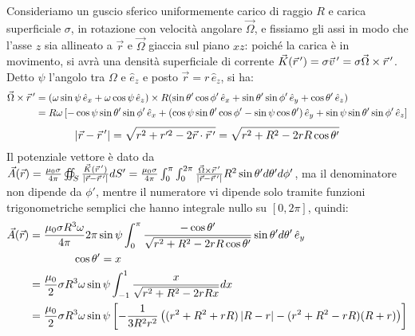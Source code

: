 Consideriamo un guscio sferico uniformemente carico di raggio $ R $ e carica superficiale $ \sigma $, in rotazione con velocità angolare $ \vec{\Omega} $, e fissiamo gli assi in modo che l'asse $ z $ sia allineato a $ \vec{r} $ e $ \vec{\Omega} $ giaccia sul piano $ xz $: poiché la carica è in movimento, si avrà una densità superficiale di corrente $ \vec{K}(\vec{r}\,') = \sigma\vec{v}\,' = \sigma\vec{\Omega}\times\vec{r}\,' $. \\ 
%
Detto $ \psi $ l'angolo tra $ \Omega $ e $ \hat{e}_z $ e posto $ \vec{r} = r\,\hat{e}_z $, si ha:
\begin{equation}
	\begin{split}
		\vec{\Omega}\times\vec{r}\,' &= (\omega \sin\psi \,\hat{e}_x + \omega \cos\psi \,\hat{e}_z) \times R (\sin\theta'\cos\phi' \,\hat{e}_x + \sin\theta'\sin\phi' \,\hat{e}_y + \cos\theta' \,\hat{e}_z) \\ 
				     &= R\omega \left[-\cos\psi\sin\theta'\sin\phi' \,\hat{e}_x + (\cos\psi\sin\theta'\cos\phi' - \sin\psi\cos\theta')\,\hat{e}_y + \sin\psi\sin\theta'\sin\phi' \,\hat{e}_z \right]
	\end{split}
	\label{eq:}
\end{equation}
\begin{equation}
	\left\lvert\vec{r} - \vec{r}\,'\right\rvert = \sqrt{r^2 + r'^2 - 2\vec{r}\cdot\vec{r}\,'} = \sqrt{r^2 + R^2 - 2rR\cos\theta'}
	\label{eq:}
\end{equation}
Il potenziale vettore è dato da $ \vec{A}(\vec{r}) = \frac{\mu_0 \sigma}{4\pi} \oiint_S \frac{\vec{K}(\vec{r}\,')}{\left\lvert\vec{r}-\vec{r}\,'\right\rvert} dS' = \frac{\mu_0 \sigma}{4\pi} \int_0^{\pi} \int_0^{2\pi} \frac{\vec{\Omega}\times\vec{r}\,'}{\left\lvert\vec{r}-\vec{r}\,'\right\rvert} R^2 \sin\theta' d\theta' d\phi' $, ma il denominatore non dipende da $ \phi' $, mentre il numeratore vi dipende solo tramite funzioni trigonometriche semplici che hanno integrale nullo su $ [0,2\pi] $, quindi:
\begin{equation}
	\begin{split}
		\vec{A}(\vec{r}) &= \displaystyle\frac{\mu_0 \sigma R^3 \omega}{4\pi} 2\pi\sin\psi \int_0^{\pi} \displaystyle\frac{-\cos\theta'}{\sqrt{r^2 + R^2 -2rR\cos\theta'}} \sin\theta' d\theta' \,\hat{e}_y \\ 
				 & \qquad\qquad \cos\theta' = x \\ 
				 &= \displaystyle\frac{\mu_0}{2} \sigma R^3 \omega \sin\psi \int_{-1}^{1} \displaystyle\frac{x}{\sqrt{r^2 + R^2 - 2rRx}} dx \\ 
				 &= \displaystyle\frac{\mu_0}{2} \sigma R^3 \omega \sin\psi \left[ -\displaystyle\frac{1}{3R^2r^2}\left( (r^2 + R^2 + rR)\left\lvert R - r\right\rvert - (r^2 + R^2 - rR)(R + r)\right)\right]
	\end{split}
	\label{eq:}
\end{equation}
